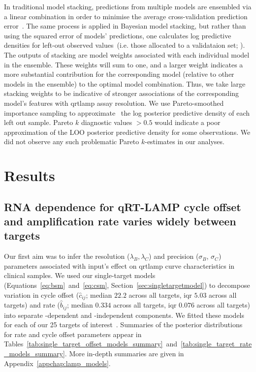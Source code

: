 \documentclass[../thesis.tex]{subfiles}
\begin{document}
In traditional model stacking, predictions from multiple models are ensembled via a linear combination in order to minimise the average cross-validation prediction error~\citep{wolpert_stacked_1992}. The same process is applied in Bayesian model stacking, but rather than using the squared error of models' predictions, one calculates log predictive densities for left-out observed values~(i.e. those allocated to a validataion set; \citealp{yao_using_2018}). The outputs of stacking are model weights associated with each individual model in the ensemble. These weights will sum to one, and a larger weight indicates a more substantial contribution for the corresponding model (relative to other models in the ensemble) to the optimal model combination. Thus, we take large stacking weights to be indicative of stronger associations of the corresponding model's features with \gls{qrtlamp} assay resolution. We use Pareto-smoothed importance sampling to approximate~\citep{vehtari_practical_2017, vehtari_pareto_2021} the log posterior predictive density of each left out sample. Pareto $k$ diagnostic values $>0.5$ would indicate a poor approximation of the LOO posterior predictive density for some observations. We did not observe any such problematic Pareto $k$-estimates in our analyses.

\section{Results \label{sec:results}}

\subsection{RNA dependence for qRT-LAMP cycle offset and amplification rate varies widely between targets\label{sec:sensitivityprecision}}
Our first aim was to infer the resolution ($\lambda_B, \lambda_C$) and precision ($\sigma_{B}$, $\sigma_{C}$) parameters associated with  input's effect on \gls{qrtlamp} curve characteristics in clinical samples. We used our single-target models (Equations~\ref{eq:bsm}~and~\ref{eq:csm}, Section~\ref{sec:singletargetmodel}) to decompose variation in cycle offset ($\hat{c}_{ij}$; median $22.2$ across all targets, \gls{iqr} $5.03$ across all targets) and rate ($\hat{b}_{ij}$; median $0.334$ across all targets, \gls{iqr} $0.076$ across all targets) into separate -dependent and -independent components. We fitted these models for each of our 25 targets of interest~\citep{he_optimization_2021}. Summaries of the posterior distributions for rate and cycle offset parameters appear in Tables~\ref{tab:single_target_offset_models_summary}~and~\ref{tab:single_target_rate_models_summary}. More in-depth summaries are given in Appendix~\ref{appchap:lamp_models}.
\end{document}
